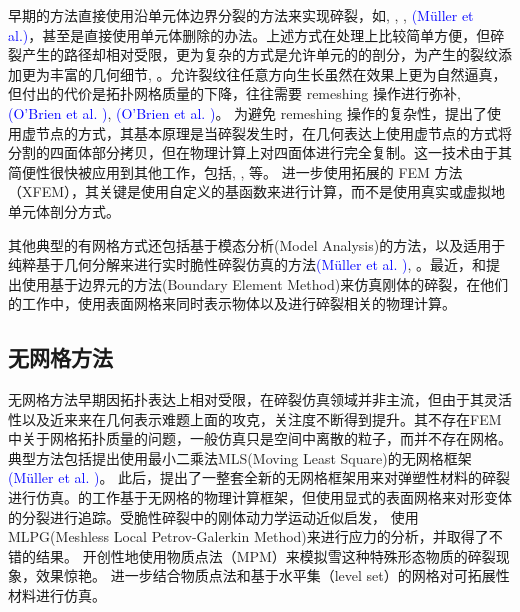 早期的方法直接使用沿单元体边界分裂的方法来实现碎裂，如, , , \textcolor{blue}{(M\"{u}ller et al.)\parencite{Muller2001}}，甚至是直接使用单元体删除的办法。上述方式在处理上比较简单方便，但碎裂产生的路径却相对受限，更为复杂的方式是允许单元的的剖分，为产生的裂纹添加更为丰富的几何细节, 。允许裂纹往任意方向生长虽然在效果上更为自然逼真，但付出的代价是拓扑网格质量的下降，往往需要 remeshing 操作进行弥补, \textcolor{blue}{(O'Brien et al. )\parencite{OBrien1999}}, \textcolor{blue}{(O'Brien et al. )\parencite{OBrien2002}}。 为避免 remeshing 操作的复杂性，提出了使用虚节点的方式，其基本原理是当碎裂发生时，在几何表达上使用虚节点的方式将分割的四面体部分拷贝，但在物理计算上对四面体进行完全复制。这一技术由于其简便性很快被应用到其他工作，包括, , 等。 进一步使用拓展的 FEM 方法（XFEM），其关键是使用自定义的基函数来进行计算，而不是使用真实或虚拟地单元体剖分方式。

其他典型的有网格方式还包括基于模态分析(Model Analysis)的方法，以及适用于纯粹基于几何分解来进行实时脆性碎裂仿真的方法\textcolor{blue}{(M\"{u}ller et al. )\parencite{Muller2013}}, 。最近，和提出使用基于边界元的方法(Boundary Element Method)来仿真刚体的碎裂，在他们的工作中，使用表面网格来同时表示物体以及进行碎裂相关的物理计算。

\subsection{无网格方法}

无网格方法早期因拓扑表达上相对受限，在碎裂仿真领域并非主流，但由于其灵活性以及近来来在几何表示难题上面的攻克，关注度不断得到提升。其不存在FEM 中关于网格拓扑质量的问题，一般仿真只是空间中离散的粒子，而并不存在网格。典型方法包括提出使用最小二乘法MLS(Moving Least Square)的无网格框架\textcolor{blue}{(M\"{u}ller et al. )\parencite{Muller2004}}。 此后，提出了一整套全新的无网格框架用来对弹塑性材料的碎裂进行仿真。的工作基于无网格的物理计算框架，但使用显式的表面网格来对形变体的分裂进行追踪。受脆性碎裂中的刚体动力学运动近似启发，
使用MLPG(Meshless Local Petrov-Galerkin Method)来进行应力的分析，并取得了不错的结果。
开创性地使用物质点法（MPM）来模拟雪这种特殊形态物质的碎裂现象，效果惊艳。
进一步结合物质点法和基于水平集（level set）的网格对可拓展性材料进行仿真。

